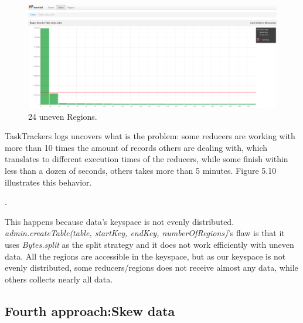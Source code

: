 \begin{figure}[htb]
\centering
\includegraphics[width=1\textwidth]{./images/24regions.png}
\caption{24 uneven Regions.} \label{fig:oneRegion}
\end{figure}

TaskTrackers logs uncovers what is the problem: some reducers are working with more than 10 times the amount of records others are dealing with, which translates to different execution times of the reducers, while some finish within less than a dozen of seconds, others takes more than 5 minutes. Figure 5.10 illustrates this behavior.

\bigskip 

 . 

\bigskip

This happens because data's keyspace is not evenly distributed. \textit{admin.createTable(table, startKey, endKey, numberOfRegions)}'s flaw is that it uses \textit{Bytes.split} as the split strategy and it does not work efficiently with uneven data. All the regions are accessible in the keyspace, but as our keyspace is not evenly distributed, some reducers/regions does not receive almost any data, while others collects nearly all data.



\subsection{Fourth approach:Skew data}

